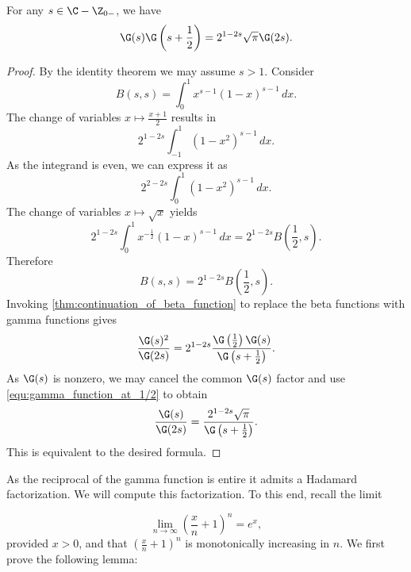 \documentclass[12pt]{article}
\begin{document}
      \begin{theorem*}
        For any \(s \in \C-\Z_{0-}\), we have
        \[
          \G(s)\G\left(s+\frac{1}{2}\right) = 2^{1-2s}\sqrt{\pi}\G(2s).
        \]
      \end{theorem*}
      \begin{proof}
        By the identity theorem we may assume \(s > 1\). Consider
        \[
          B(s,s) = \int_{0}^{1}x^{s-1}(1-x)^{s-1}\,dx.
        \]
        The change of variables \(x \mapsto \frac{x+1}{2}\) results in
        \[
          2^{1-2s}\int_{-1}^{1}(1-x^{2})^{s-1}\,dx.
        \]
        As the integrand is even, we can express it as
        \[
          2^{2-2s}\int_{0}^{1}(1-x^{2})^{s-1}\,dx.
        \]
        The change of variables \(x \mapsto \sqrt{x}\) yields
        \[
          2^{1-2s}\int_{0}^{1}x^{-\frac{1}{2}}(1-x)^{s-1}\,dx = 2^{1-2s}B\left(\frac{1}{2},s\right).
        \]
        Therefore
        \[
          B(s,s) = 2^{1-2s}B\left(\frac{1}{2},s\right).
        \]
        Invoking \cref{thm:continuation_of_beta_function} to replace the beta functions with gamma functions gives
        \[
          \frac{\G(s)^{2}}{\G(2s)} = 2^{1-2s}\frac{\G\left(\frac{1}{2}\right)\G(s)}{\G\left(s+\frac{1}{2}\right)}.
        \]
        As \(\G(s)\) is nonzero, we may cancel the common \(\G(s)\) factor and use \cref{equ:gamma_function_at_1/2} to obtain
        \[
          \frac{\G(s)}{\G(2s)} = \frac{2^{1-2s}\sqrt{\pi}}{\G\left(s+\frac{1}{2}\right)}.
        \]
        This is equivalent to the desired formula.
      \end{proof}

      As the reciprocal of the gamma function is entire it admits a Hadamard factorization. We will compute this factorization. To this end, recall the limit

      \begin{equation}\label{equ:limit_form_of_exponential}
        \lim_{n \to \infty}\left(\frac{x}{n}+1\right)^{n} = e^{x},
      \end{equation}
      provided \(x > 0\), and that \(\left(\frac{x}{n}+1\right)^{n}\) is monotonically increasing in \(n\). We first prove the following lemma:
\end{document}
